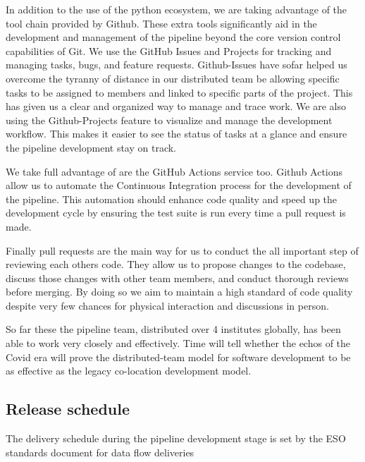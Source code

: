 \documentclass[a4paper]{spie}  %
\begin{document}
In addition to the use of the python ecosystem, we are taking advantage of the tool chain provided by Github. 
These extra tools significantly aid in the development and management of the pipeline beyond the core version control capabilities of Git. 
We use the GitHub Issues and Projects for tracking and managing tasks, bugs, and feature requests. 
Github-Issues have sofar helped us overcome the tyranny of distance in our distributed team be allowing specific tasks to be assigned to members and linked to specific parts of the project. 
This has given us a clear and organized way to manage and trace work. 
We are also using the Github-Projects feature to visualize and manage the development workflow. 
This makes it easier to see the status of tasks at a glance and ensure the pipeline development stay on track.

We take full advantage of are the GitHub Actions service too. 
Github Actions allow us to automate the Continuous Integration process for the development of the pipeline. 
This automation should enhance code quality and speed up the development cycle by ensuring the test suite is run every time a pull request is made. 

Finally pull requests are the main way for us to conduct the all important step of reviewing each others code. 
They allow us to propose changes to the codebase, discuss those changes with other team members, and conduct thorough reviews before merging. 
By doing so we aim to maintain a high standard of code quality despite very few chances for physical interaction and discussions in person.

So far these the pipeline team, distributed over 4 institutes globally, has been able to work very closely and effectively. 
Time will tell whether the echos of the Covid era will prove the distributed-team model for software development to be as effective as the legacy co-location development model.


\subsection{Release schedule}
\label{subsec:imp_schedule}

The delivery schedule during the pipeline development stage is set by the ESO standards document for data flow deliveries \cite{1618}
\end{document}

